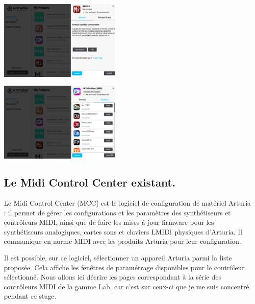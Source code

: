 \documentclass[francais]{rapportPFE}  %
\begin{document}
\begin{center}
    \centering
    \begin{minipage}{.5\textwidth}
    \centering
    \includegraphics[width=6cm]{graphics/details.png}
    \label{fig:test1}
    \end{minipage}%
    \begin{minipage}{.5\textwidth}
    \centering
    \includegraphics[width=6cm]{graphics/detailsbundle.png}
    \label{fig:test2}
    \end{minipage}
    \end{center}




\subsection{Le Midi Control Center existant.}

Le Midi Control Center \cite{mcc}
 (MCC) est le logiciel de configuration de matériel Arturia : il
permet de gérer les configurations et les paramètres des synthétiseurs et contrôleurs MIDI, ainsi que de faire les mises à jour firmware pour les synthétiseurs analogiques, cartes sons et claviers LMIDI physiques d'Arturia. Il communique en norme MIDI avec les produits Arturia pour leur configuration.

Il est possible, sur ce logiciel, sélectionner un appareil Arturia parmi la liste proposée. Cela affiche les fenêtres de paramétrage disponibles pour le contrôleur sélectionné. Nous allons ici décrire les pages correspondant à la série des contrôleurs MIDI de la gamme Lab, car c'est sur ceux-ci que je me suis concentré pendant ce stage.
\end{document}
